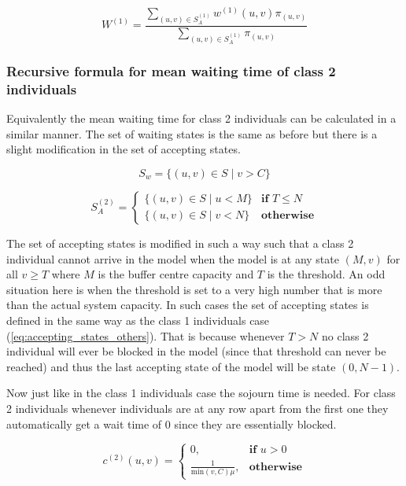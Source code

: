 \begin{equation} \label{eq:recursive-waiting-time-others}
    W^{(1)} = \frac{\sum_{(u,v) \in S_A^{(1)}} w^{(1)}(u,v) 
    \pi_{(u,v)}}{\sum_{(u,v) \in S_A^{(1)}} \pi_{(u,v)}}
\end{equation}



\subsubsection{Recursive formula for mean waiting time of 
class 2 individuals} \label{sec:recursive-waiting-time-ambulance}

Equivalently the mean waiting time for class 2 individuals can be calculated 
in a similar manner. 
The set of waiting states is the same as before but there is a slight modification 
in the set of accepting states.

\[
    S_w = \{(u, v) \in S \; | \; v > C \}    
\]

\begin{equation}\label{eq:accepting_states_ambulance}
    S_A^{(2)}=
    \begin{cases}
        \{(u, v) \in S \; | \; u < M \} & \textbf{if } T \leq N\\
        \{(u, v) \in S \; | \; v < N \} & \textbf{otherwise}
    \end{cases}
\end{equation}

The set of accepting states is modified in such a way such that a class 2 
individual cannot arrive in the model when the model is at any state \((M, v)\) 
for 
all \(v \geq T\) where \(M\) is the buffer centre capacity and \(T\) is the threshold. 
An odd situation here is when the threshold is set to a very high number that is 
more than the actual system capacity. 
In such cases the set of accepting states is defined in the same way as the 
class 1 individuals case (\ref{eq:accepting_states_others}). 
That is because whenever \(T > N\) no class 2 individual will ever be blocked in 
the model 
(since that threshold can never be reached) and thus the last accepting state of 
the model will be state \( (0,N-1)\). 

Now just like in the class 1 individuals case the sojourn time is needed. 
For class 2 individuals whenever individuals are at any row apart from the 
first one they automatically get a wait time of \(0\) since they are essentially 
blocked.

\begin{equation} \label{eq:sojourn_ambulance}
    c^{(2)}(u,v) = 
    \begin{cases}
        0, & \textbf{if } u > 0 \\
        \frac{1}{\text{min}(v,C)\mu}, & \textbf{otherwise}
    \end{cases}
\end{equation}

